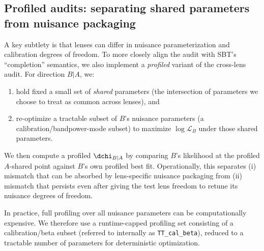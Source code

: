 \subsection{Profiled audits: separating shared parameters from nuisance packaging}
\label{sec:profiled-audit}

A key subtlety is that lenses can differ in nuisance parameterization and calibration degrees of freedom. To more closely align the audit with SBT's ``completion'' semantics, we also implement a \emph{profiled} variant of the cross-lens audit. For direction $B|A$, we:
\begin{enumerate}[leftmargin=*, itemsep=2pt]
  \item hold fixed a small set of \emph{shared} parameters (the intersection of parameters we choose to treat as common across lenses), and
  \item re-optimize a tractable subset of $B$'s nuisance parameters (a calibration/bandpower-mode subset) to maximize $\log \mathcal{L}_B$ under those shared parameters.
\end{enumerate}
We then compute a profiled $\dchi_{B|A}$ by comparing $B$'s likelihood at the profiled $A$-shared point against $B$'s own profiled best fit. Operationally, this separates (i) mismatch that can be absorbed by lens-specific nuisance packaging from (ii) mismatch that persists even after giving the test lens freedom to retune its nuisance degrees of freedom.

In practice, full profiling over all nuisance parameters can be computationally expensive. We therefore use a runtime-capped profiling set consisting of a calibration/beta subset (referred to internally as \texttt{TT\_cal\_beta}), reduced to a tractable number of parameters for deterministic optimization.
